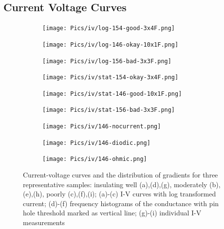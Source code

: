 \subsection{Current Voltage Curves} 
\begin{figure}
    \centering
    \begin{subfigure}{.3\textwidth}
        \texttt{[image: Pics/iv/log-154-good-3x4F.png]}
		\caption{}%
		\label{fig:iv-log-good}
    \end{subfigure}
    \begin{subfigure}{.3\textwidth}
        \texttt{[image: Pics/iv/log-146-okay-10x1F.png]}
		\caption{}%
		\label{fig:iv-log-okay}
    \end{subfigure}
    \begin{subfigure}{.3\textwidth}
        \texttt{[image: Pics/iv/log-156-bad-3x3F.png]}
		\caption{}%
		\label{fig:iv-log-bad}
    \end{subfigure}
    \begin{subfigure}{.3\textwidth}
        \texttt{[image: Pics/iv/stat-154-okay-3x4F.png]}
		\caption{}%
		\label{fig:iv-stat-good}
    \end{subfigure}
    \begin{subfigure}{.3\textwidth}
        \texttt{[image: Pics/iv/stat-146-good-10x1F.png]}
		\caption{}%
		\label{fig:iv-stat-okay}
    \end{subfigure}
    \begin{subfigure}{.3\textwidth}
        \texttt{[image: Pics/iv/stat-156-bad-3x3F.png]}
		\caption{}%
		\label{fig:iv-stat-bad}
    \end{subfigure}
    \begin{subfigure}{.3\textwidth}
        \texttt{[image: Pics/iv/146-nocurrent.png]}
		\caption{}%
		\label{fig:iv-nocurrent}
    \end{subfigure}
    \begin{subfigure}{.3\textwidth}
        \texttt{[image: Pics/iv/146-diodic.png]}
		\caption{}%
		\label{fig:iv-diodic}
    \end{subfigure}
    \begin{subfigure}{.3\textwidth}
        \texttt{[image: Pics/iv/146-ohmic.png]}
		\caption{}%
		\label{fig:iv-ohmic}
    \end{subfigure}
	\caption{
		Current-voltage curves and the distribution of gradients for three representative samples: insulating well (a),(d),(g), moderately (b),(e),(h), poorly (c),(f),(i); 
		(a)-(c) I-V curves with log transformed current; 
		(d)-(f) frequency histograms of the conductance with pin hole threshold marked as vertical line; 
		(g)-(i) individual I-V measurements
	}
    \label{fig:iv}
\end{figure}

